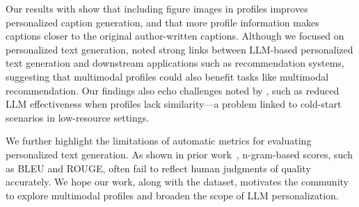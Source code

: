 
Our results with \dataset show that including figure images in profiles improves personalized caption generation, and that more profile information makes captions closer to the original author-written captions.
Although we focused on personalized text generation, \citeauthor{zhang2024personalization} noted strong links between LLM-based personalized text generation and downstream applications such as recommendation systems, suggesting that multimodal profiles could also benefit tasks like multimodal recommendation.
Our findings also echo challenges noted by \citeauthor{zhang2024personalization}, such as reduced LLM effectiveness when profiles lack similarity---a problem linked to cold-start scenarios in low-resource settings. 

We further highlight the limitations of automatic metrics for evaluating personalized text generation.
As shown in prior work~\cite{salemi2025expert}, n-gram-based scores, such as BLEU and ROUGE, often fail to reflect human judgments of quality accurately.
We hope our work, along with the \dataset dataset, motivates the community to explore multimodal profiles and broaden the scope of LLM personalization.









